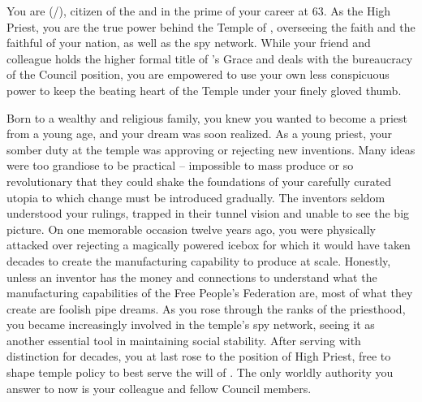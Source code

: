 \documentclass[char]{GL2020}
\begin{document}
\name{\cAntiChup{}}

You are \cAntiChup{\full} (\cAntiChup{\they}/\cAntiChup{\them}), citizen of the \pTech{} and in the prime of your career at 63.  As the High Priest, you are the true power behind the Temple of \cTechGod{}, overseeing the faith and the faithful of your nation, as well as the \pTech{} spy network. While your friend and colleague \cCouncilPriest{} holds the higher formal title of \cTechGod{}'s Grace and deals with the bureaucracy of the Council position, you are empowered to use your own less conspicuous power to keep the beating heart of the Temple under your finely gloved thumb. 

Born to a wealthy and religious family, you knew you wanted to become a priest from a young age, and your dream was soon realized. As a young priest, your somber duty at the temple was approving or rejecting new inventions. Many ideas were too grandiose to be practical – impossible to mass produce or so revolutionary that they could shake the foundations of your carefully curated utopia to which change must be introduced gradually. The inventors seldom understood your rulings, trapped in their tunnel vision and unable to see the big picture. On one memorable occasion twelve years ago, you were physically attacked over rejecting a magically powered icebox for which it would have taken decades to create the manufacturing capability to produce at scale. Honestly, unless an inventor has the money and connections to understand what the manufacturing capabilities of the Free People's Federation are, most of what they create are foolish pipe dreams. As you rose through the ranks of the priesthood, you became increasingly involved in the temple's spy network, seeing it as another essential tool in maintaining social stability. After serving with distinction for decades, you at last rose to the position of High Priest, free to shape temple policy to best serve the will of \cTechGod{}. The only worldly authority you answer to now is your colleague \cCouncilPriest{} and \cCouncilPriest{\their} fellow Council members.
\end{document}

